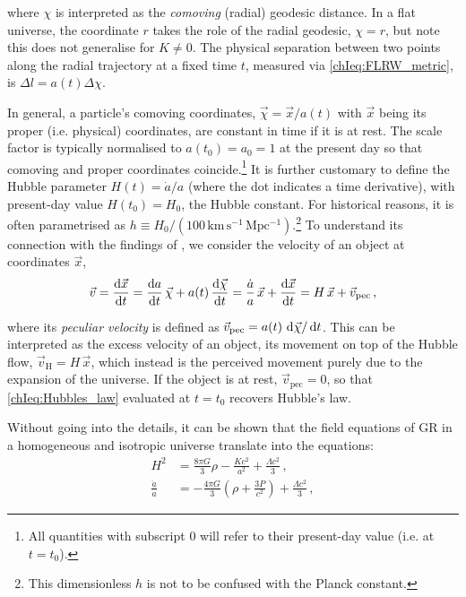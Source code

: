 \noindent where $\chi$ is interpreted as the \textit{comoving} (radial) geodesic distance. In a flat universe, the coordinate $r$ takes the role of the radial geodesic, $\chi = r$, but note this does not generalise for $K \neq 0$. The physical separation between two points along the radial trajectory at a fixed time $t$, measured via \cref{chIeq:FLRW_metric}, is $\Delta l = a(t) \Delta \chi$.

In general, a particle's comoving coordinates, $\vec{\chi} = \vec{x} / a(t)$ with $\vec{x}$ being its proper (i.e. physical) coordinates, are constant in time if it is at rest. The scale factor is typically normalised to $a(t_0) = a_0 = 1$ at the present day so that comoving and proper coordinates coincide.\footnote{All quantities with subscript $0$ will refer to their present-day value (i.e. at $t = t_0$).} It is further customary to define the Hubble parameter $H(t) = \dot{a}/a$ (where the dot indicates a time derivative), with present-day value $H(t_0) = H_0$, the Hubble constant. For historical reasons, it is often parametrised as $h \equiv H_0/(100 \, \mathrm{km \, s^{-1} \, Mpc^{-1}})$.\footnote{This dimensionless $h$ is not to be confused with the Planck constant.} To understand its connection with the findings of \citet{1929PNAS...15..168H}, we consider the velocity of an object at coordinates $\vec{x}$,
\begin{equation}
    \label{chIeq:Hubbles_law}
    \vec{v} = \frac{\dif \vec{x}}{\dif t} = \frac{\dif a}{\dif t} \, \vec{\chi} + a(t) \, \frac{\dif \vec{\chi}}{\dif t} = \frac{\dot{a}}{a} \, \vec{x} + \frac{\dif \vec{x}}{\dif t} = H \, \vec{x} + \vec{v}_\text{pec} \, ,
\end{equation}

\noindent where its \textit{peculiar velocity} is defined as $\vec{v}_\text{pec} = a(t) \, \dif \vec{\chi} / \dif t$. This can be interpreted as the excess velocity of an object, its movement on top of the Hubble flow, $\vec{v}_\text{H} = H \, \vec{x}$, which instead is the perceived movement purely due to the expansion of the universe. If the object is at rest, $\vec{v}_\text{pec} = 0$, so that \cref{chIeq:Hubbles_law} evaluated at $t = t_0$ recovers Hubble's law.

Without going into the details, it can be shown \citep[see e.g.][]{2010gfe..book.....M} that the field equations of GR in a homogeneous and isotropic universe translate into the \citeauthor{1922ZPhy...10..377F} equations:
\begin{align}
    \label{chIeq:Friedmann_equation1}
    H^2 & = \frac{8 \pi G}{3} \rho - \frac{K c^2}{a^2} + \frac{\Lambda c^2}{3} \, ,
    \\
    \label{chIeq:Friedmann_equation2}
    \frac{\ddot{a}}{a} & =  -\frac{4 \pi G}{3} \left( \rho + \frac{3 P}{c^2} \right) + \frac{\Lambda c^2}{3} \, ,
\end{align}

